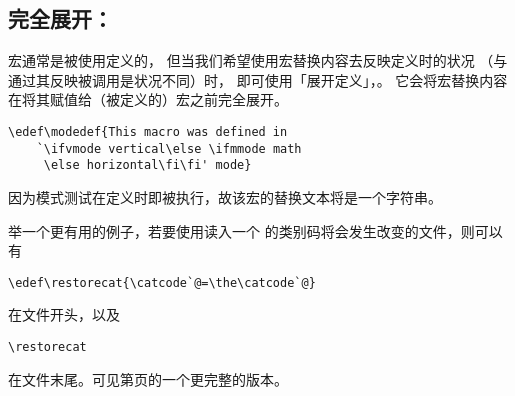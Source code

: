 \documentclass{book}
\begin{document}
\subsection{完全展开：\protect{}}
\label{expand:edef}

宏通常是被使用定义的，
但当我们希望使用宏替换内容去反映定义时的状况
（与通过其反映被调用是状况不同）时，
即可使用「展开定义」，。
它会将宏替换内容在将其赋值给（被定义的）宏之前完全展开。

\begin{example}
\begin{verbatim}
\edef\modedef{This macro was defined in
    `\ifvmode vertical\else \ifmmode math
     \else horizontal\fi\fi' mode}
\end{verbatim}
因为模式测试在定义时即被执行，故该宏的替换文本将是一个字符串。

举一个更有用的例子，若要使用读入一个
\texttt{\@} 的类别码将会发生改变的文件，则可以有
\begin{verbatim}
\edef\restorecat{\catcode`@=\the\catcode`@}
\end{verbatim}
在文件开头，以及
\begin{verbatim}
\restorecat
\end{verbatim}
在文件末尾。可见第\pageref{store:cat}页的一个更完整的版本。
\end{example}
\end{document}
